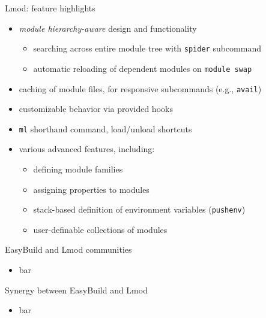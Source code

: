 \documentclass[10pt,xcolor={usenames,dvipsnames}]{beamer}
\begin{document}

\begin{frame}{Lmod: feature highlights}
    \begin{itemize}
        \item \emph{module hierarchy-aware} design and functionality
        \begin{itemize}
            \item searching across entire module tree with \texttt{spider} subcommand
            \item automatic reloading of dependent modules on \texttt{module swap}
        \end{itemize}
        \item caching of module files, for responsive subcommands (e.g., \texttt{avail})
        \item customizable behavior via provided hooks
        \item \texttt{ml} shorthand command, load/unload shortcuts
        \item various advanced features, including:
        \begin{itemize}
            \item defining module families
            \item assigning properties to modules
            \item stack-based definition of environment variables (\texttt{pushenv})
            \item user-definable collections of modules
        \end{itemize}
    \end{itemize}
\end{frame}


\begin{frame}{EasyBuild and Lmod communities}
\begin{itemize}
    \item bar
\end{itemize}
\end{frame}


\begin{frame}{Synergy between EasyBuild and Lmod}
\begin{itemize}
    \item bar
\end{itemize}
\end{frame}
\end{document}
